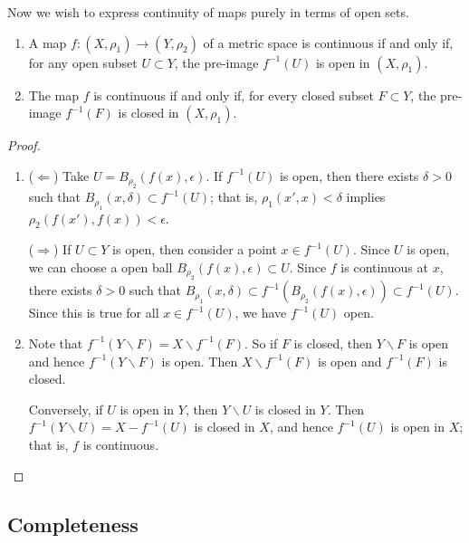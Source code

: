 Now we wish to express continuity of maps purely in terms of open sets.

\begin{proposition}
\mbox{}
\begin{enumerate}
	\shortskip
	\item A map $f:(X,\rho_1) \to (Y,\rho_2)$ of a metric space is continuous if and only if, for any open subset $U\subset Y$, the pre-image $f^{-1}(U)$ is open in $(X,\rho_1)$.
	\item The map $f$ is continuous if and only if, for every closed subset $F\subset Y$, the pre-image $f^{-1}(F)$ is closed in $(X,\rho_1)$.
\end{enumerate}
\end{proposition}

\begin{proof}
\mbox{}
\begin{enumerate}
	\item ($\Leftarrow$) Take $U=B_{\rho_2}(f(x),\epsilon)$. If $f^{-1}(U)$ is open, then there exists $\delta>0$ such that $B_{\rho_1}(x,\delta)\subset f^{-1}(U)$; that is, $\rho_1(x',x)<\delta$ implies $\rho_2(f(x'),f(x))<\epsilon$. %
	
	($\Rightarrow$) If $U\subset Y$ is open, then consider a point $x\in f^{-1}(U)$. Since $U$ is open, we can choose a open ball $B_{\rho_2}(f(x),\epsilon)\subset U$. Since $f$ is continuous at $x$, there exists $\delta>0$ such that $B_{\rho_1}(x,\delta) \subset f^{-1}(B_{\rho_2}(f(x),\epsilon)) \subset f^{-1}(U)$. Since this is true for all $x\in f^{-1}(U)$, we have $f^{-1}(U)$ open. %
	
	\item Note that $f^{-1}(Y\backslash F)=X\backslash f^{-1}(F)$. So if $F$ is closed, then $Y\backslash F$ is open and hence $f^{-1}(Y\backslash F)$ is open. Then $X\backslash f^{-1}(F)$ is open and $f^{-1}(F)$ is closed. %
	
	Conversely, if $U$ is open in $Y$, then $Y\backslash U$ is closed in $Y$. Then $f^{-1}(Y\backslash U)=X-f^{-1}(U)$ is closed in $X$, and hence $f^{-1}(U)$ is open in $X$; that is, $f$ is continuous. \qedhere
\end{enumerate}
\end{proof}


	\pagebreak

\subsection{Completeness} %
\label{sub:completeness}


